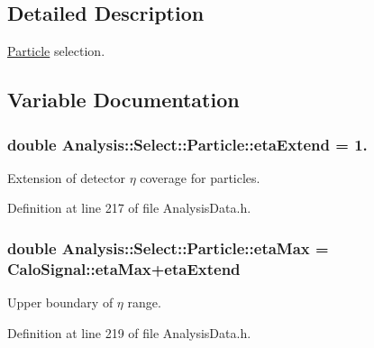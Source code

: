 \subsection{Detailed Description}
\hyperlink{namespaceAnalysis_1_1Select_1_1Particle}{Particle} selection. 

\subsection{Variable Documentation}
\subsubsection[{\texorpdfstring{eta\+Extend}{etaExtend}}]{\setlength{\rightskip}{0pt plus 5cm}double Analysis\+::\+Select\+::\+Particle\+::eta\+Extend = 1.\hspace{0.3cm}{\ttfamily [static]}}\hypertarget{namespaceAnalysis_1_1Select_1_1Particle_ab5299c0a57bfa014570ccdeded3bcaf5}{}\label{namespaceAnalysis_1_1Select_1_1Particle_ab5299c0a57bfa014570ccdeded3bcaf5}


Extension of detector $ \eta $ coverage for particles. 



Definition at line 217 of file Analysis\+Data.\+h.

\subsubsection[{\texorpdfstring{eta\+Max}{etaMax}}]{\setlength{\rightskip}{0pt plus 5cm}double Analysis\+::\+Select\+::\+Particle\+::eta\+Max = Calo\+Signal\+::eta\+Max+{\bf eta\+Extend}\hspace{0.3cm}{\ttfamily [static]}}\hypertarget{namespaceAnalysis_1_1Select_1_1Particle_a216c67e30d7e332f2da3e29fe69a9c06}{}\label{namespaceAnalysis_1_1Select_1_1Particle_a216c67e30d7e332f2da3e29fe69a9c06}


Upper boundary of $ \eta $ range. 



Definition at line 219 of file Analysis\+Data.\+h.

